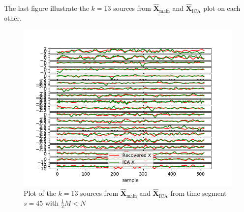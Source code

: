 The last figure illustrate the $k = 13$ sources from $\hat{\mathbf{X}}_{\text{main}}$ and $\hat{\mathbf{X}}_{\text{ICA}}$ plot on each other.
\begin{figure}[H]
    \centering
	\includegraphics[scale=0.5]{figures/ch_7/Sources_2M_N.png}
	\caption{Plot of the $k = 13$ sources from $\hat{\mathbf{X}}_{\text{main}}$ and $\hat{\mathbf{X}}_{\text{ICA}}$ from time segment $s = 45$ with $\frac{1}{2} M<N$}
	\label{fig:M<<N_3}
\end{figure} 
\noindent
